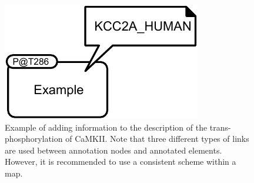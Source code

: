 \begin{figure}[htb]
  \centering
  \includegraphics[scale = 0.8]{examples/ex-annotation}
  \caption{Example of  adding information to the
    description of the trans-phosphorylation of CaMKII. Note that
    three different types of links are used between annotation nodes
    and annotated elements. However, it is recommended to use a
    consistent scheme within a map.}
  \label{fig:techref:ex-annotation}
\end{figure}
